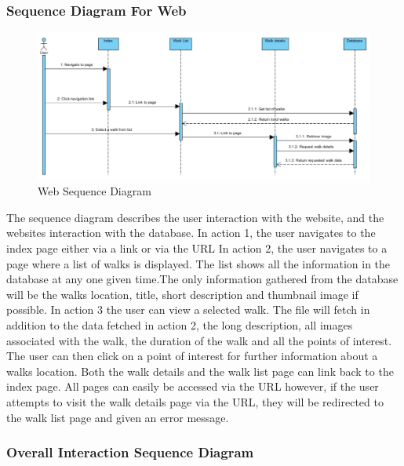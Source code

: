 \documentclass[12pt]{article}
\begin{document}
\subsubsection{Sequence Diagram For Web}
\begin{figure}[htp]
\begin{adjustwidth}{-2cm}{0cm}
\centering
\includegraphics[scale=0.70]{Design/web_sequence_diagram.PNG}
\caption{Web Sequence Diagram}
\label{Web Sequence Diagram}
\end{adjustwidth}
\end{figure}
The sequence diagram describes the user interaction with the website, and the websites interaction with the database.
In action 1, the user navigates to the index page either via a link or via the URL
In action 2, the user navigates to a page where a list of walks is displayed. The list shows all the information in the database at any one given time.The only information gathered from the database will be the walks location, title, short description and thumbnail image if possible.
In action 3 the user can view a selected walk. The file will fetch in addition to the data fetched in action 2, the long description, all images associated with the walk, the duration of the walk and all the points of interest. The user can then click on a point of interest for further information about a walks location.
Both the walk details and the walk list page can link back to the index page. All pages can easily be accessed via the URL however, if the user attempts to visit the walk details page via the URL, they will be redirected to the walk list page and given an error message.
\clearpage
\subsubsection{Overall Interaction Sequence Diagram}
\end{document}
